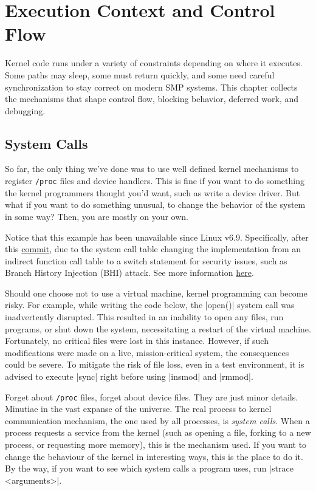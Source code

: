 \documentclass[10pt, oneside]{book}
\begin{document}
\chapter{Execution Context and Control Flow}
Kernel code runs under a variety of constraints depending on where it executes.
Some paths may sleep, some must return quickly, and some need careful
synchronization to stay correct on modern SMP systems. This chapter collects
the mechanisms that shape control flow, blocking behavior, deferred work, and
debugging.

\section{System Calls}
\label{sec:syscall}
So far, the only thing we've done was to use well defined kernel mechanisms to register \verb|/proc| files and device handlers.
This is fine if you want to do something the kernel programmers thought you'd want, such as write a device driver.
But what if you want to do something unusual, to change the behavior of the system in some way?
Then, you are mostly on your own.

Notice that this example has been unavailable since Linux v6.9.
Specifically, after this \href{https://github.com/torvalds/linux/commit/1e3ad78334a69b36e107232e337f9d693dcc9df2#diff-4a16bf89a09b4f49669a30d54540f0b936ea0224dc6ee9edfa7700deb16c3e11R52}{commit}, due to the system call table changing the implementation from an indirect function call table to a switch statement for security issues, such as Branch History Injection (BHI) attack.
See more information \href{https://bugs.launchpad.net/ubuntu/+source/linux/+bug/2060909}{here}.

Should one choose not to use a virtual machine, kernel programming can become risky.
For example, while writing the code below, the \cpp|open()| system call was inadvertently disrupted.
This resulted in an inability to open any files, run programs, or shut down the system, necessitating a restart of the virtual machine.
Fortunately, no critical files were lost in this instance.
However, if such modifications were made on a live, mission-critical system, the consequences could be severe.
To mitigate the risk of file loss, even in a test environment, it is advised to execute \sh|sync| right before using \sh|insmod| and \sh|rmmod|.

Forget about \verb|/proc| files, forget about device files.
They are just minor details.
Minutiae in the vast expanse of the universe.
The real process to kernel communication mechanism, the one used by all processes, is \emph{system calls}.
When a process requests a service from the kernel (such as opening a file, forking to a new process, or requesting more memory), this is the mechanism used.
If you want to change the behaviour of the kernel in interesting ways, this is the place to do it.
By the way, if you want to see which system calls a program uses, run \sh|strace <arguments>|.
\end{document}
